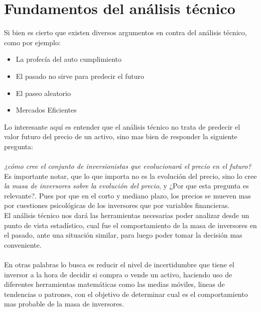 \section{Fundamentos del análisis técnico}

Si bien es cierto que existen diversos argumentos en contra del análisis técnico, como por ejemplo:

\begin{itemize}
	\item La profecía del auto cumplimiento
	\item El pasado no sirve para predecir el futuro
	\item El paseo aleatorio
	\item Mercados Eficientes
\end{itemize}

Lo interesante aquí es entender que el análisis técnico no trata de predecir el valor futuro del precio de un activo, sino mas bien de responder la siguiente pregunta:\\\\

\emph{¿cómo cree el conjunto de inversionistas que evolucionará el precio en el futuro? }
\\

Es importante notar, que lo que importa no es la evolución del precio, sino lo cree \emph{la masa de inversores sobre la evolución del precio}, y ¿Por que esta pregunta es relevante?. Pues por que en el corto y mediano plazo, los precios se mueven mas por cuestiones psicológicas de los inversores que por variables financieras.\\

El análisis técnico nos dará las herramientas necesarias poder analizar desde un punto de vista estadístico, cual fue el comportamiento de la masa de inversores en el pasado, ante una situación similar, para luego poder tomar la decisión mas conveniente.
\\\\
En otras palabras lo busca es reducir el nivel de incertidumbre que tiene el inversor a la hora de decidir si compra o vende un activo, haciendo uso de diferentes herramientas matemáticas como las medias móviles, lineas de tendencias o patrones, con el objetivo de determinar cual es el comportamiento mas probable de la masa de inversores.


